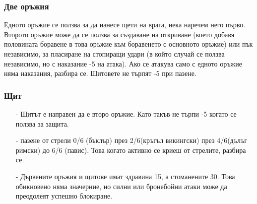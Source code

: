 \subsubsection{Две оръжия}
Едното оръжие се ползва за да нанесе щети на врага, нека наречем него първо.
Второто оръжие може да се ползва за създаване на откриване (което добавя половината боравене в това оръжие към боравенето с основното оръжие) или пък независимо, за пласиране на стопиращи удари (в който случай се ползва независимо, но с наказание -5 на атака).
Ако се атакува само с едното оръжие няма наказания, разбира се.
Щитовете не търпят -5 при пазене.

\subsubsection{Щит}
\begin{itemize}
\item[-]{Щитът е направен да е второ оръжие. Като такъв не търпи -5 когато се ползва за защита.}
\item[-]{пазене от стрели 0/6 (бъклър) през 2/6(кръгъл викингски) през 4/6(дълъг римски) до 6/6 (павис). Това когато активно се криеш от стрелите, разбира се.}
\item[-]{Дървените оръжия и щитове имат здравина 15, а стоманените 30. Това обикновено няма значерние, но силни или бронебойни атаки може да преодолеят успешно блокиране.}
\end{itemize}


